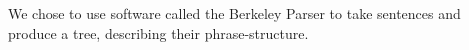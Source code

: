 We chose to use software called the Berkeley Parser \cite{berkeleynlpgroupsoftware2009} to take sentences and produce a tree, describing their phrase-structure.
